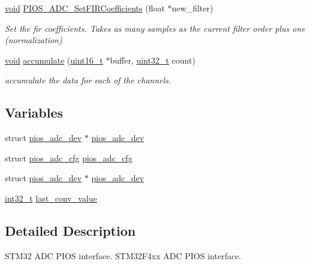 \begin{DoxyCompactItemize}
\hyperlink{group___n_a_m_e_ga18028b8badbf1ea7e704ccac3c488e82}{void} \hyperlink{group___p_i_o_s___a_d_c_gab2bb95efd8a061a377ae0d8cd60ca1ed}{P\-I\-O\-S\-\_\-\-A\-D\-C\-\_\-\-Set\-F\-I\-R\-Coefficients} (float $\ast$new\-\_\-filter)
\begin{DoxyCompactList}\small\item\em Set the fir coefficients. Takes as many samples as the current filter order plus one (normalization) \end{DoxyCompactList}\item 
\hyperlink{group___n_a_m_e_ga18028b8badbf1ea7e704ccac3c488e82}{void} \hyperlink{group___p_i_o_s___a_d_c_ga7cf4581a50ff57300061ea450f87a007}{accumulate} (\hyperlink{stdint_8h_a273cf69d639a59973b6019625df33e30}{uint16\-\_\-t} $\ast$buffer, \hyperlink{stdint_8h_a435d1572bf3f880d55459d9805097f62}{uint32\-\_\-t} count)
\begin{DoxyCompactList}\small\item\em accumulate the data for each of the channels. \end{DoxyCompactList}\end{DoxyCompactItemize}
\subsection*{Variables}
\begin{DoxyCompactItemize}
\item 
struct \hyperlink{structpios__adc__dev}{pios\-\_\-adc\-\_\-dev} $\ast$ \hyperlink{group___p_i_o_s___a_d_c_gab32db3584e1b8779726fcabc7aa2dc9a}{pios\-\_\-adc\-\_\-dev}
\item 
struct \hyperlink{structpios__adc__cfg}{pios\-\_\-adc\-\_\-cfg} \hyperlink{group___p_i_o_s___a_d_c_ga14da091ebda49e985ec01bc39f918eed}{pios\-\_\-adc\-\_\-cfg}
\item 
struct \hyperlink{structpios__adc__dev}{pios\-\_\-adc\-\_\-dev} $\ast$ \hyperlink{group___p_i_o_s___a_d_c_gab32db3584e1b8779726fcabc7aa2dc9a}{pios\-\_\-adc\-\_\-dev}
\item 
\hyperlink{group___n_a_m_e_gafd12020da5a235dfcf0c3c748fb5baed}{int32\-\_\-t} \hyperlink{group___p_i_o_s___a_d_c_ga093162eccbf300ef9e9fe2cfd9d956f6}{last\-\_\-conv\-\_\-value}
\end{DoxyCompactItemize}


\subsection{Detailed Description}
S\-T\-M32 A\-D\-C P\-I\-O\-S interface. S\-T\-M32\-F4xx A\-D\-C P\-I\-O\-S interface.

